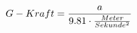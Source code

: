 \documentclass[preview]{standalone}
\begin{document}
\begin{align*}
\special{dvisvgm:raw <g id='unique000'>}G-Kraft = \frac{a}{9.81 \cdot \frac{Meter}{Sekunde^{2}}}\special{dvisvgm:raw </g>}
\end{align*}
\end{document}
